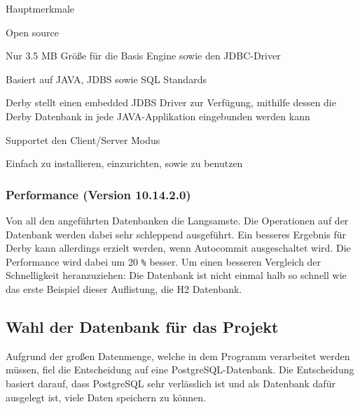 \begin{compactitem}
    \item [Hauptmerkmale]
    \item Open source
    \item Nur 3.5 MB Größe für die Basis Engine sowie den JDBC-Driver        
    \item Basiert auf JAVA, JDBS sowie SQL Standards
    \item Derby stellt einen embedded JDBS Driver zur Verfügung, mithilfe dessen die Derby Datenbank in jede JAVA-Applikation eingebunden werden kann
    \item Supportet den Client/Server Modus
    \item Einfach zu installieren, einzurichten, sowie zu benutzen
\end{compactitem}
\cite{ApacheDerbyOfficialSite}
 

\subsubsection{Performance (Version 10.14.2.0)}
Von all den angeführten Datenbanken die Langsamste. Die Operationen auf der Datenbank werden dabei sehr schleppend ausgeführt. Ein besseres Ergebnis für Derby kann allerdings erzielt werden, wenn Autocommit ausgeschaltet wird. Die Performance wird dabei um 20 \texttt{\%} besser. Um einen besseren Vergleich der Schnelligkeit heranzuziehen: Die Datenbank ist nicht einmal halb so schnell wie das erste Beispiel dieser Auflistung, die H2 Datenbank. \cite{databaseComparison}

\subsection{Wahl der Datenbank für das Projekt}
Aufgrund der großen Datenmenge, welche in dem Programm verarbeitet werden müssen, fiel die Entscheidung auf eine PostgreSQL-Datenbank. Die Entscheidung basiert darauf, dass PostgreSQL sehr verlässlich ist und als Datenbank dafür ausgelegt ist, viele Daten speichern zu können. 
